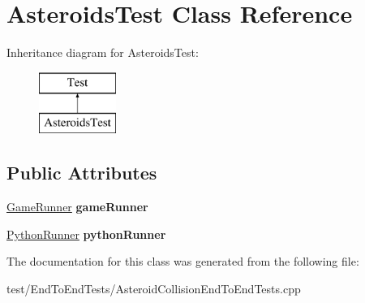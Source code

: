 \hypertarget{classAsteroidsTest}{}\section{Asteroids\+Test Class Reference}
\label{classAsteroidsTest}
Inheritance diagram for Asteroids\+Test\+:\begin{figure}[H]
\begin{center}
\leavevmode
\includegraphics[height=2.000000cm]{classAsteroidsTest}
\end{center}
\end{figure}
\subsection*{Public Attributes}
\begin{DoxyCompactItemize}
\item 
\hyperlink{classGameRunner}{Game\+Runner} {\bfseries game\+Runner}\hypertarget{classAsteroidsTest_ad1af818c13b9401c5a92ca0da1f01620}{}\label{classAsteroidsTest_ad1af818c13b9401c5a92ca0da1f01620}

\item 
\hyperlink{classPythonRunner}{Python\+Runner} {\bfseries python\+Runner}\hypertarget{classAsteroidsTest_ac1d713b11a2c68611616e01251490770}{}\label{classAsteroidsTest_ac1d713b11a2c68611616e01251490770}

\end{DoxyCompactItemize}


The documentation for this class was generated from the following file\+:\begin{DoxyCompactItemize}
\item 
test/\+End\+To\+End\+Tests/Asteroid\+Collision\+End\+To\+End\+Tests.\+cpp\end{DoxyCompactItemize}
